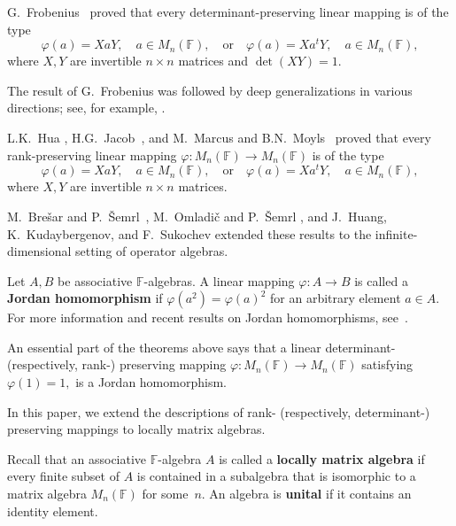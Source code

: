 \documentclass[12pt]{amsart}
\begin{document}
{ 
	
	G.~Frobenius~\cite{Frobenius} proved that every determinant-preserving linear mapping is of the type  
	\[
	\varphi(a) = X a Y, \quad a \in M_n(\mathbb{F}), \quad \text{or} \quad 	\varphi(a) = X a^t Y, \quad a \in M_n(\mathbb{F}),
	\]
	where $X, Y$ are invertible $n \times n$ matrices and $	\det(X Y) = 1.$
	
 The result of 	G.~Frobenius was followed by deep generalizations in various directions; see, for example, \cite{Dieudonne,Dolinar_Semrl,Huang_et}.
 
 L.K.~Hua \cite{Hua}, H.G.~Jacob~\cite{Jacob}, and M.~Marcus and B.N.~Moyls~\cite{Marcus_Moyls} proved that every rank-preserving linear mapping $	\varphi:M_n(\mathbb{F}) \to M_n(\mathbb{F})$ is of the type 	\[
 \varphi(a) = X a Y, \quad a \in M_n(\mathbb{F}), \quad \text{or} \quad 	\varphi(a) = X a^t Y, \quad a \in M_n(\mathbb{F}),
 \]
 where $X, Y$ are invertible $n \times n$ matrices.
 
 M.~Bre\v{s}ar and P.~\v{S}emrl~\cite{Bresar_0}, M.~Omladi\v{c} and P.~\v{S}emrl \cite{OmladicSemrl1993RankOne}, and J.~Huang, K.~Kudaybergenov, and F.~Sukochev \cite{Huang_Kudaybergenov_Sukochev}	extended these results to the infinite-dimensional setting of operator algebras. 
 
 
 
 
	
	Let $A, B$ be associative $\mathbb{F}$-algebras.  
	A linear mapping $\varphi \colon A \to B$ is called a \textbf{Jordan homomorphism} if	$\varphi(a^2) = \varphi(a)^2$	for an arbitrary element $a \in A$. For more information and recent results on Jordan homomorphisms, see~\cite{Bresar_Zelmanov}.
		
 
An essential part of the theorems above says that a linear determinant- (respectively, rank-) preserving mapping $\varphi \colon M_n(\mathbb{F}) \to M_n(\mathbb{F})$
	satisfying 	 $\varphi(1) = 1,$ is a Jordan homomorphism.  
	
		
		
		In this paper, we extend the descriptions of rank- (respectively, determinant-) preserving mappings to  locally matrix  algebras.
		


		
		Recall that an associative $\mathbb{F}$-algebra $A$ is called a \textbf{locally matrix algebra} if every finite subset of $A$ is contained in a subalgebra that is isomorphic to a matrix algebra $M_n(\mathbb{F})$ for some~$n$.  
		An algebra is \textbf{unital} if it contains an identity element.
		
}
\end{document}
